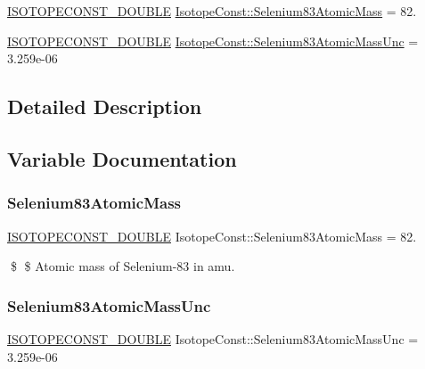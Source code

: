 \begin{DoxyCompactItemize}
\item 
\mbox{\hyperlink{group___isotope_const-_macros_ga8f45a7272ce02c0b4c65c44636ed719a}{I\+S\+O\+T\+O\+P\+E\+C\+O\+N\+S\+T\+\_\+\+D\+O\+U\+B\+LE}} \mbox{\hyperlink{group___isotope_const-_selenium-_se83_ga69e5a19c7134fab90b15c12549075d4b}{Isotope\+Const\+::\+Selenium83\+Atomic\+Mass}} = 82.
\item 
\mbox{\hyperlink{group___isotope_const-_macros_ga8f45a7272ce02c0b4c65c44636ed719a}{I\+S\+O\+T\+O\+P\+E\+C\+O\+N\+S\+T\+\_\+\+D\+O\+U\+B\+LE}} \mbox{\hyperlink{group___isotope_const-_selenium-_se83_gab4ea04a8ccf57ffb1fe3046fa29039a7}{Isotope\+Const\+::\+Selenium83\+Atomic\+Mass\+Unc}} = 3.\+259e-\/06
\end{DoxyCompactItemize}


\subsection{Detailed Description}


\subsection{Variable Documentation}
\mbox{\label{group___isotope_const-_selenium-_se83_ga69e5a19c7134fab90b15c12549075d4b}} 
\subsubsection{\texorpdfstring{Selenium83\+Atomic\+Mass}{Selenium83AtomicMass}}
{\footnotesize\ttfamily \mbox{\hyperlink{group___isotope_const-_macros_ga8f45a7272ce02c0b4c65c44636ed719a}{I\+S\+O\+T\+O\+P\+E\+C\+O\+N\+S\+T\+\_\+\+D\+O\+U\+B\+LE}} Isotope\+Const\+::\+Selenium83\+Atomic\+Mass = 82.}

\$ \$ Atomic mass of Selenium-\/83 in amu. \mbox{\label{group___isotope_const-_selenium-_se83_gab4ea04a8ccf57ffb1fe3046fa29039a7}} 
\subsubsection{\texorpdfstring{Selenium83\+Atomic\+Mass\+Unc}{Selenium83AtomicMassUnc}}
{\footnotesize\ttfamily \mbox{\hyperlink{group___isotope_const-_macros_ga8f45a7272ce02c0b4c65c44636ed719a}{I\+S\+O\+T\+O\+P\+E\+C\+O\+N\+S\+T\+\_\+\+D\+O\+U\+B\+LE}} Isotope\+Const\+::\+Selenium83\+Atomic\+Mass\+Unc = 3.\+259e-\/06}

